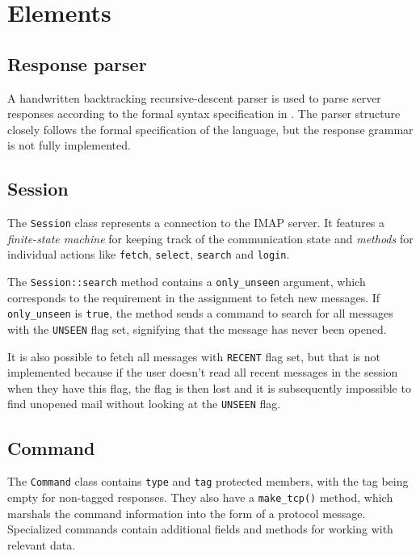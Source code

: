 \documentclass[a4]{report}
\begin{document}
\section{Elements}

\subsection{Response parser}

A handwritten backtracking recursive-descent parser is used to parse server responses according to the formal syntax specification in \cite{rfc3501}. The parser structure closely follows the formal specification of the language, but the response grammar is not fully implemented.

\subsection{Session}

The \texttt{Session} class represents a connection to the IMAP server. It features a \textit{finite-state machine} for keeping track of the communication state and \textit{methods} for individual actions like \texttt{fetch}, \texttt{select}, \texttt{search} and \texttt{login}.

The \texttt{Session::search} method contains a \texttt{only\_unseen} argument, which corresponds to the requirement in the assignment to fetch new messages. If \texttt{only\_unseen} is \texttt{true}, the method sends a command to search for all messages with the \texttt{UNSEEN} flag set, signifying that the message has never been opened.

It is also possible to fetch all messages with \texttt{RECENT} flag set, but that is not implemented because if the user doesn't read all recent messages in the session when they have this flag, the flag is then lost and it is subsequently impossible to find unopened mail without looking at the \texttt{UNSEEN} flag.

\subsection{Command}

The \texttt{Command} class contains \texttt{type} and \texttt{tag} protected members, with the tag being empty for non-tagged responses. They also have a \texttt{make\_tcp()} method, which marshals the command information into the form of a protocol message. Specialized commands contain additional fields and methods for working with relevant data.
\end{document}
